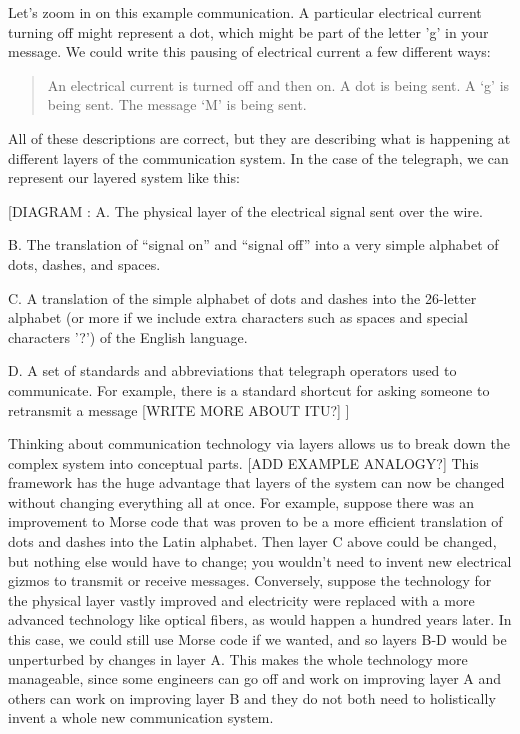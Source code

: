 \documentclass[UTF8]{book}
\begin{document}
\begin{CJK}{UTF8}{gbsn}
Let's zoom in on this example communication. A particular electrical current turning off might represent a dot, which might be part of the letter 'g' in your message. We could write this pausing of electrical current a few different ways:

\begin{quotation}
\centering
An electrical current is turned off and then on.
A dot is being sent.
A `g' is being sent.
The message `M' is being sent.
\end{quotation}

All of these descriptions are correct, but they are describing what is happening at different layers of the communication system. In the case of the telegraph, we can represent our layered system like this:

[DIAGRAM :
A. The physical layer of the electrical signal sent over the wire.

B. The translation of “signal on” and “signal off” into a very simple alphabet of dots, dashes, and spaces.

C. A translation of the simple alphabet of dots and dashes into the 26-letter alphabet (or more if we include extra characters such as spaces and special characters '?') of the English language.

D. A set of standards and abbreviations that telegraph operators used to communicate. For example, there is a standard shortcut for asking someone to retransmit a message [WRITE MORE ABOUT ITU?]
]

Thinking about communication technology via layers allows us to break down the complex system into conceptual parts. [ADD EXAMPLE ANALOGY?] This framework has the huge advantage that layers of the system can now be changed without changing everything all at once. For example, suppose there was an improvement to Morse code that was proven to be a more efficient translation of dots and dashes into the Latin alphabet. Then layer C above could be changed, but nothing else would have to change; you wouldn't need to invent new electrical gizmos to transmit or receive messages. Conversely, suppose the technology for the physical layer vastly improved and electricity were replaced with a more advanced technology like optical fibers, as would happen a hundred years later. In this case, we could still use Morse code if we wanted, and so layers B-D would be unperturbed by changes in layer A. This makes the whole technology more manageable, since some engineers can go off and work on improving layer A and others can work on improving layer B and they do not both need to holistically invent a whole new communication system.


\end{CJK}
\end{document}
